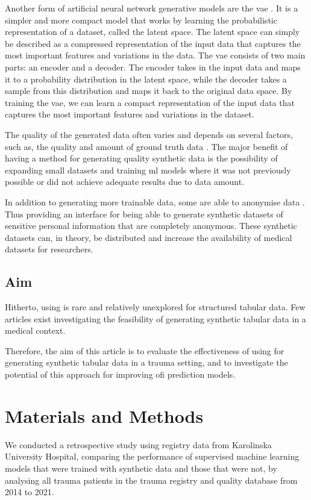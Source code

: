\documentclass[12pt, letterpaper]{article}
\begin{document}
Another form of artificial neural network generative models are the \acrfull{vae} \cite{}. It is a simpler and more compact model that works by
learning the probabilistic representation of a dataset, called the latent space. The latent space can simply be described as a compressed representation of the input data that captures the most important features and variations in the data. The \acrshort{vae} consists of two main parts: an encoder and a decoder. The encoder takes in the input data and maps it to a probability distribution in the latent space, while the decoder takes a sample from this distribution and maps it back to the original data space. By training the \acrshort{vae}, we can learn a compact representation of the input data that captures the most important features and variations in the dataset.


The quality of the generated data often varies and depends on several factors, such as, the quality and amount of ground truth data \cite{}. The major benefit of having a method for generating quality synthetic data is the possibility of expanding small datasets and training \acrshort{ml} models where it was not previously possible or did not achieve adequate results due to data amount.

In addition to generating more trainable data, some  are able to anonymise data \cite{}. Thus providing an interface for being able to generate synthetic datasets of sensitive personal information that are completely anonymous. These synthetic datasets can, in theory, be distributed and increase the availability of medical datasets for researchers.

\subsection{Aim}
Hitherto, using  is rare and relatively unexplored for structured tabular data. Few articles exist investigating the feasibility of generating synthetic tabular data in a medical context.

Therefore, the aim of this article is to evaluate the effectiveness of using  for generating synthetic tabular data in a trauma setting, and to investigate the potential of this approach for improving \acrshort{ofi} prediction models.

\section{Materials and Methods}
We conducted a retrospective study using registry data from Karolinska University Hospital, comparing the performance of supervised machine learning models that were trained with synthetic data and those that were not, by analysing all trauma patients in the trauma registry and quality database from 2014 to 2021.
\end{document}
